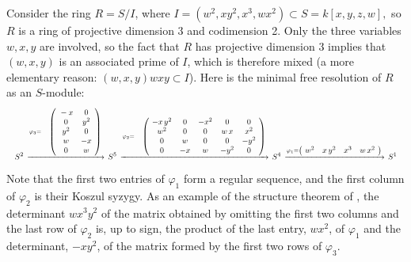 \documentclass[11pt]{amsart}
\def\phi{{\varphi}}
\begin{document}
\begin{example}\label{ex:structure}
Consider the ring
 $R = S/I$, where
$I = (w^2, xy^2, x^3, wx^2)\subset S = k[x,y,z,w],$ so $R$ is a
ring of projective dimension 3 and codimension 2. Only the three variables $w,x,y$ are involved, so  
the fact that $R$ has projective dimension 3 implies that $(w,x,y)$ is an associated prime of $I$,
which is therefore mixed (a more elementary reason: $(w,x,y)wxy\subset I$).
Here is the minimal free resolution of $R$ as an $S$-module:
\[
\resizebox{\linewidth}{!}{$\displaystyle
%
S^{2}\,\xrightarrow{\phi_3 =\begin{array}{l}\vphantom{y^{2}0}\\\vphantom{0y^{2}}\\\vphantom{-x0}\\\vphantom{w-x}\\\vphantom{0w}\end{array}\left(\!\begin{array}{cc}
      \vphantom{\left\{5\right\}}-x&0\\
      \vphantom{\left\{4\right\}}0&y^{2}\\
      \vphantom{\left\{4\right\}}y^{2}&0\\
      \vphantom{\left\{5\right\}}w&-x\\
      \vphantom{\left\{5\right\}}0&w
      \end{array}\!\right)}\,
      S^{5}\,\xrightarrow{\phi_2 =\begin{array}{l} \vphantom{-x^{2}0-x\,y^{2}00}\\ \vphantom{w-x0-y^{2}0}\\ \vphantom{0w00-y^{2}}\\ \vphantom{00w^{2}w\,xx^{2}}\end{array}\left(\!\begin{array}{ccccc}
     -x\,y^{2}&0&-x^{2}&0&0\\
      w^{2}&0&0&w\,x&x^{2}\\
      0&w&0&0&-y^{2}\\
      0&-x&w&-y^{2}&0
      \end{array}\!\right)}\,S^{4}
      \, \xrightarrow{\phi_1 =\left(
\!\begin{array}{cccc}
      w^{2}&x\,y^{2}&x^{3}&w\,x^{2}
      \end{array}  
      \!\right)}\,S^{1}
      $}
\]
 Note that the first two entries of $\phi_1$ form a regular sequence,
and the first column of $\phi_2$ is their Koszul syzygy. As an example of the structure theorem of \cite{structure},
the determinant $wx^3y^2$ of the matrix obtained by omitting the first two columns and the last row of $\phi_2$
is, up to sign, the product of the last entry, $wx^2$, of $\phi_1$ and the determinant, $-xy^{2}$, of the matrix formed by the first two
rows of $\phi_3$.
\end{example}
\end{document}
